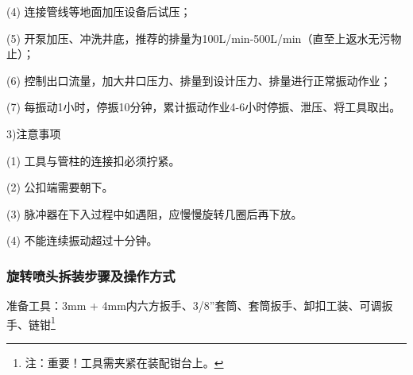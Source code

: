 (4) 连接管线等地面加压设备后试压；

(5) 开泵加压、冲洗井底，推荐的排量为100L/min-500L/min（直至上返水无污物止）；

(6) 控制出口流量，加大井口压力、排量到设计压力、排量进行正常振动作业；

(7) 每振动1小时，停振10分钟，累计振动作业4-6小时停振、泄压、将工具取出。

3)注意事项

(1) 工具与管柱的连接扣必须拧紧。

(2) 公扣端需要朝下。

(3) 脉冲器在下入过程中如遇阻，应慢慢旋转几圈后再下放。

(4) 不能连续振动超过十分钟。

\subsubsection{旋转喷头拆装步骤及操作方式}


准备工具：3mm + 4mm内六方扳手、3/8''套筒、套筒扳手、卸扣工装、可调扳手、链钳\footnote{注：重要！工具需夹紧在装配钳台上。}

